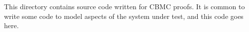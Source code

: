 This directory contains source code written for CBMC proofs. It is common to write some code to model aspects of the system under test, and this code goes here. 